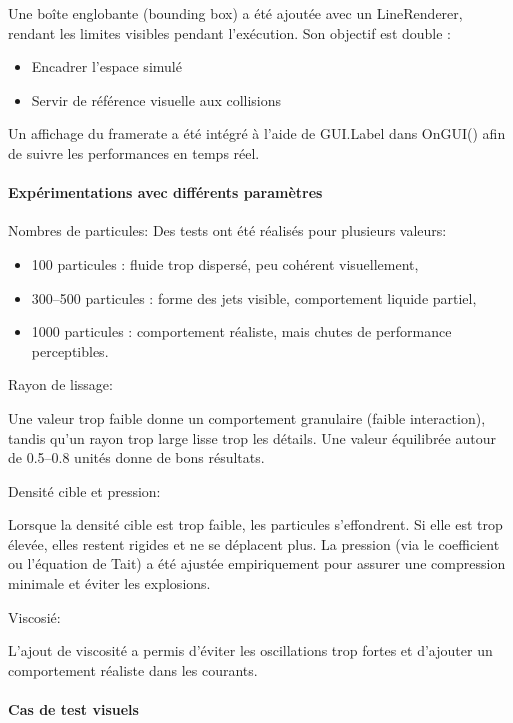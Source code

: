 \documentclass{article}
\begin{document}
Une boîte englobante (bounding box) a été ajoutée avec un LineRenderer, rendant les limites visibles pendant l'exécution. Son objectif est double :

\begin{itemize}
    \item Encadrer l’espace simulé
    \item Servir de référence visuelle aux collisions
\end{itemize}

Un affichage du framerate a été intégré à l’aide de GUI.Label dans OnGUI() afin de suivre les performances en temps réel.

\paragraph{ Expérimentations avec différents paramètres}

Nombres de particules: Des tests ont été réalisés pour plusieurs valeurs:

\begin{itemize}
    \item 100 particules : fluide trop dispersé, peu cohérent visuellement,
    \item 300–500 particules : forme des jets visible, comportement liquide partiel,
    \item 1000 particules : comportement réaliste, mais chutes de performance perceptibles.
\end{itemize}

Rayon de lissage:

Une valeur trop faible donne un comportement granulaire (faible interaction), tandis qu’un rayon trop large lisse trop les détails. Une valeur équilibrée autour de 0.5–0.8 unités donne de bons résultats.

Densité cible et pression:

Lorsque la densité cible est trop faible, les particules s'effondrent. Si elle est trop élevée, elles restent rigides et ne se déplacent plus. La pression (via le coefficient ou l’équation de Tait) a été ajustée empiriquement pour assurer une compression minimale et éviter les explosions.

Viscosié:

L'ajout de viscosité a permis d'éviter les oscillations trop fortes et d’ajouter un comportement réaliste dans les courants.

\paragraph{Cas de test visuels}
\end{document}
